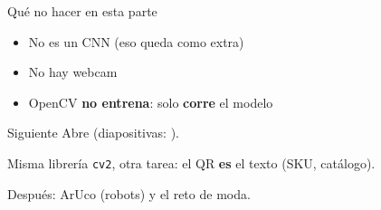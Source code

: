 \documentclass[aspectratio=169]{beamer}
\begin{document}
\begin{frame}{Qué no hacer en esta parte}
  \begin{itemize}
    \item No es un CNN (eso queda como extra)
    \item No hay webcam
    \item OpenCV \textbf{no entrena}: solo \textbf{corre} el modelo
  \end{itemize}
\end{frame}

\begin{frame}{Siguiente}
  Abre  (diapositivas: ).

  Misma librería \texttt{cv2}, otra tarea: el QR \textbf{es} el texto (SKU, catálogo).

  Después: ArUco (robots) y el reto de moda.
\end{frame}
\end{document}
